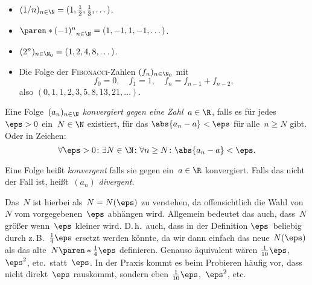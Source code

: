 \documentclass[a4paper]{article}
\begin{document}
\begin{example}\leavevmode
    \begin{itemize}
        \item $(1/n)_{n \in \N} = (1, \frac{1}{2}, \frac{1}{3}, \dots)$.
        \item $\paren*{(-1)^n}_{n \in \N} = (1, -1, 1, -1, \dots)$.
        \item $(2^n)_{n \in \N_0} = (1, 2, 4, 8, \dots)$.
        \item Die Folge der \textsc{Fibonacci}-Zahlen $(f_n)_{n \in \N_0}$ mit
              \begin{equation*}
                  f_0 = 0,\quad f_1 = 1,\quad f_n = f_{n-1} + f_{n-2},
              \end{equation*}
              also $(0, 1, 1, 2, 3, 5, 8, 13, 21, \dots)$.
    \end{itemize}
\end{example}


\begin{definition}[Konvergenz]\label{def:convergence}
    Eine Folge~$(a_n)_{n \in \N}$ \emph{konvergiert gegen eine Zahl~$a \in \R$}, falls es für jedes~$\eps > 0$ ein~$N \in \N$ existiert, für das $\abs{a_n - a} < \eps$ für alle~$n \geq N$ gibt. Oder in Zeichen:
    \begin{equation*}
        \forall \eps > 0\colon \exists N \in \N\colon \forall n \geq N\colon \abs{a_n - a} < \eps.
    \end{equation*}

    Eine Folge heißt \emph{konvergent} falls sie gegen ein~$a \in \R$ konvergiert. Falls das nicht der Fall ist, heißt~$(a_n)$ \emph{divergent}.
\end{definition}

\begin{remark}
    Das~$N$ ist hierbei als~$N = N(\eps)$ zu verstehen, da offensichtlich die Wahl von~$N$ vom vorgegebenen~$\eps$ abhängen wird. Allgemein bedeutet das auch, dass~$N$ größer wenn~$\eps$ kleiner wird. D.\,h.\ auch, dass in der Definition $\eps$~beliebig durch z.\,B.\ $\frac{1}{4}\eps$ ersetzt werden könnte, da wir dann einfach das neue~$N(\eps)$ als das alte~$N\paren*{\frac{1}{4}\eps}$ definieren. Genauso äquivalent wären $\frac{1}{10}\eps$,~$\eps^2$, etc.\ statt~$\eps$. In der Praxis kommt es beim Probieren häufig vor, dass nicht direkt~$\eps$ rauskommt, sondern eben $\frac{1}{10}\eps$,~$\eps^2$, etc.
\end{remark}
\end{document}

